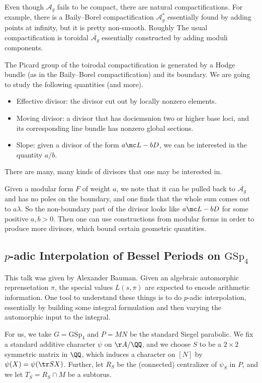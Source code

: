 \documentclass{article}
\begin{document}
Even though $\mathcal A_g$ fails to be compact, there are natural compactifications. For example, there is a Baily--Borel compactification $\mathcal A_g^*$ essentially found by adding points at infinity, but it is pretty non-smooth. Roughly The usual compactification is toroidal $\overline{\mathcal A_g}$ essentially constructed by adding moduli components.

The Picard group of the toirodal compactification is generated by a Hodge bundle (as in the Baily--Borel compactification) and its boundary. We are going to study the following quantities (and more).
\begin{itemize}
	\item Effective divisor: the divisor cut out by locally nonzero elements.
	\item Moving divisor: a divisor that has dociemsnion two or higher base loci, and its corresponding line bundle has nonzero global sections.
	\item Slope: given a divisor of the form $a\mc L-bD$, we can be interested in the quantity $a/b$.
\end{itemize}
There are many, many kinds of divisors that one may be interested in.

Given a modular form $F$ of weight $a$, we note that it can be pulled back to $\overline{\mathcal A_g}$ and has no poles on the boundary, and one finds that the whole sum comes out to $a\lambda$. So the non-boundary part of the divisor looks like $a\mc L-bD$ for some positive $a,b>0$. Then one can use constructions from modular forms in order to produce more divisors, which bound certain geometric quantities.

\subsection{\texorpdfstring{$p$-}{p-}adic Interpolation of Bessel Periods on \texorpdfstring{$\mathrm{GSp}_4$}{ GSp4}}
This talk was given by Alexander Bauman. Given an algebraic automorphic reprensetation $\pi$, the special values $L(s,\pi)$ are expected to encode arithmetic information. One tool to understand these things is to do $p$-adic interpolation, essentially by building some integral formulation and then varying the automorphic input to the integral.

For us, we take $G=\mathrm{GSp}_4$ and $P=MN$ be the standard Siegel parabolic. We fix a standard additive character $\psi$ on $\AA/\QQ$, and we choose $S$ to be a $2\times2$ symmetric matrix in $\QQ$, which induces a character on $[N]$ by $\psi(X)=\psi(\tr SX)$. Further, let $R_S$ be the (connected) centralizer of $\psi_S$ in $P$, and we let $T_S=R_S\cap M$ be a subtorus.
\end{document}
